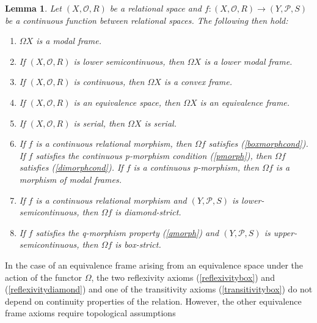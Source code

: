 \documentclass{article}[a4paper]
\newtheorem{lemma}{Lemma}%
\theoremstyle{definition}
\newcommand{\Ocal}{\mathcal{O}} %
\newcommand{\Pcal}{\mathcal{P}} %
\newcommand{\dirim}{^{\rightarrow\!}}
\begin{document}
\begin{lemma}
\label{results:Omega}
Let $(X, \Ocal , R)$ be a relational space and $f:(X, \Ocal , R) \longrightarrow (Y, \Pcal , S)$ be a continuous function between relational spaces. The following then hold: 
\begin{enumerate}
\item $\Omega X$ is a modal frame. 


\item If $(X, \Ocal , R)$ is lower semicontinuous, then $\Omega X$ is a lower modal frame.

\item If $(X, \Ocal , R)$ is continuous, then $\Omega X$ is a convex frame.

\item    
If $(X, \Ocal , R)$ is an equivalence space, then $\Omega X$ is an equivalence frame. 

\item If $(X, \Ocal , R)$ is serial, then $\Omega X$ is serial.

\item If $f$ 
is a continuous relational morphism, then 
$\Omega f$ satisfies (\ref{boxmorphcond}). If $f$ satisfies the continuous p-morphism condition (\ref{pmorph}), then $\Omega f$ satisfies (\ref{dimorphcond}). If $f$ is a continuous p-morphism, then $\Omega f$ is a morphism of modal frames.

\item If $f$ is a continuous relational morphism and $(Y,\Pcal,S)$ is lower-semicontinuous, then $\Omega f$ is diamond-strict.

\item If $f$ satisfies the q-morphism property (\ref{qmorph}) and $(Y,\Pcal,S)$ is upper-semicontinuous, then $\Omega f$ is box-strict.
\end{enumerate}
\end{lemma}

In the case of an equivalence frame arising from an equivalence space under the action of the functor $\Omega$, the two reflexivity axioms (\ref{reflexivitybox}) and  (\ref{reflexivitydiamond}) and one of the transitivity axioms (\ref{transitivitybox}) do not depend on continuity properties of the relation. However, the other equivalence frame axioms require topological assumptions 
\end{document}
